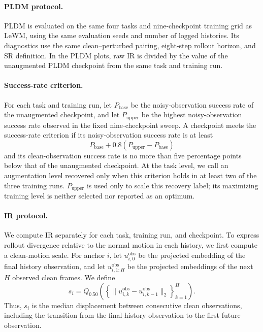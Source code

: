 \documentclass[10pt]{article}
\begin{document}
\paragraph{PLDM protocol.}
PLDM is evaluated on the same four tasks and nine-checkpoint training grid as
LeWM, using the same evaluation seeds and number of logged histories. Its
diagnostics use the same clean--perturbed pairing, eight-step rollout horizon,
and SR definition. In the PLDM plots, raw IR is divided by the value of the
unaugmented PLDM checkpoint from the same task and training run.

\paragraph{Success-rate criterion.}
For each task and training run, let $P_{\mathrm{base}}$ be the
noisy-observation success rate of the unaugmented checkpoint, and let
$P_{\mathrm{upper}}$ be the highest noisy-observation success rate observed in
the fixed nine-checkpoint sweep. A checkpoint meets the success-rate criterion if its
noisy-observation success rate is at least
\[
P_{\mathrm{base}}+0.8(P_{\mathrm{upper}}-P_{\mathrm{base}})
\]
and its clean-observation success rate is no more than five percentage points
below that of the unaugmented checkpoint. At the task level, we call an
augmentation level recovered only when this criterion holds in at least two
of the three training runs. $P_{\mathrm{upper}}$ is used only to scale this
recovery label; its maximizing training level is neither selected nor reported
as an optimum.

\paragraph{IR protocol.}
We compute IR separately for each task, training run, and checkpoint. To
express rollout divergence relative to the normal motion in each history, we
first compute a clean-motion scale. For anchor $i$, let
$u^{\mathrm{obs}}_{i,0}$ be the projected embedding of the final history
observation, and let $u^{\mathrm{obs}}_{i,1:H}$ be the projected embeddings of
the next $H$ observed clean frames. We define
\begin{equation}
s_i
=Q_{0.50}\!\left(
\left\{\|u^{\mathrm{obs}}_{i,k}-u^{\mathrm{obs}}_{i,k-1}\|_2
\right\}_{k=1}^{H}
\right).
\label{eq:clean-transition-scale}
\end{equation}
Thus, $s_i$ is the median displacement between consecutive clean observations,
including the transition from the final history observation to the first
future observation.
\end{document}
